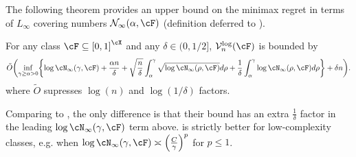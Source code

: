 The following theorem provides an upper bound on the minimax regret in terms of $L_\infty$ covering numbers $\mathcal{N}_{\infty}(\alpha,\F)$ (definition deferred to ).
\begin{theorem}
\label{thm:logloss_minimax}
For any class $\cF\subseteq{}\brk*{0,1}^{\cX}$ and any $\delta\in(0,1/2]$, $\mathcal{V}^{\mathrm{log}}_n(\F)$ is bounded by
\[
\tilde{O}\prn*{\inf_{\gamma\geq{}\alpha>0}\crl*{ \log\cN_{\infty}(\gamma, \cF)
    +     \frac{\alpha{}n}{\delta}
      + \sqrt{\frac{n}{\delta}}\int_{\alpha}^{\gamma}\sqrt{\log\cN_{\infty}(\rho,\cF)}d\rho
      + \frac{1}{\delta}\int_{\alpha}^{\gamma}\log\cN_{\infty}(\rho,\F)d\rho}
     + \delta{}n
    }.\]
where $\tilde{O}$ supresses $\log(n)$ and $\log(1/\delta)$ factors.
\end{theorem}
Comparing to \cite[Theorem 4]{RakSri15}, the only difference is that their bound has an extra $\frac{1}{\delta}$ factor in the leading $\log\cN_{\infty}(\gamma,\cF)$ term above.  is strictly better for low-complexity classes, e.g. when $\log\cN_{\infty}(\gamma,\cF)\asymp\prn*{\frac{C}{\gamma}}^{p}$ for $p\leq{}1$.
